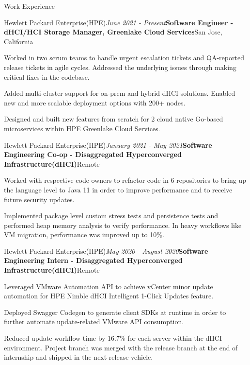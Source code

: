 \documentclass{resume}
\begin{document}
\begin{rSection}{Work Experience}

\begin{rSubsection}{Hewlett Packard Enterprise(HPE)}{\em June 2021 - Present}{\textbf{Software Engineer - dHCI/HCI Storage Manager, Greenlake Cloud Services}}{San Jose, California}{}
\item Worked in two scrum teams to handle urgent escalation tickets and QA-reported release tickets in agile cycles. Addressed the underlying issues through making critical fixes in the codebase. 
\item Added multi-cluster support for on-prem and hybrid dHCI solutions. Enabled new and more scalable deployment options with 200+ nodes. 
\item Designed and built new features from scratch for 2 cloud native Go-based microservices within HPE Greenlake Cloud Services. 


\end{rSubsection}
\begin{rSubsection}{Hewlett Packard Enterprise(HPE)}{\em January 2021 - May 2021}{\textbf{Software Engineering Co-op - Disaggregated Hyperconverged Infrastructure(dHCI)}}{Remote}{}
\item Worked with respective code owners to refactor code in 6 repositories to bring up the language level to Java 11 in order to improve performance and to receive future security updates.
\item Implemented package level custom stress tests and persistence tests and performed heap memory analysis to verify performance. In heavy workflows like VM migration, performance was improved up to 10\%.




\end{rSubsection}

\begin{rSubsection}{Hewlett Packard Enterprise(HPE)}{\em May 2020 - August 2020}{\textbf{Software Engineering Intern - Disaggregated Hyperconverged Infrastructure(dHCI)}}{Remote}{}
\item Leveraged VMware Automation API to achieve vCenter minor update automation for HPE Nimble dHCI Intelligent 1-Click Updates feature. 
\item Deployed Swagger Codegen to generate client SDKs at runtime in order to further automate update-related VMware API consumption.
\item Reduced update workflow time by 16.7\% for each server within the dHCI environment. Project branch was merged with the release branch at the end of internship and shipped in the next release vehicle. 


\end{rSubsection}








\end{rSection}
\end{document}
